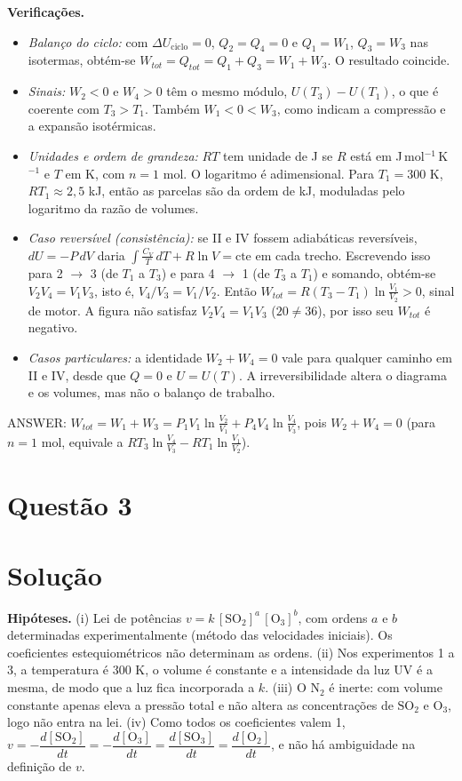 \documentclass{article}%
\begin{document}
\noindent\textbf{Verificações.}
\begin{itemize}
  \item \emph{Balanço do ciclo:} com $\Delta U_{\text{ciclo}} = 0$, $Q_2 = Q_4 = 0$ e $Q_1 = W_1$, $Q_3 = W_3$ nas isotermas, obtém-se $W_{tot} = Q_{tot} = Q_1 + Q_3 = W_1 + W_3$. O resultado coincide.
  \item \emph{Sinais:} $W_2 < 0$ e $W_4 > 0$ têm o mesmo módulo, $U(T_3) - U(T_1)$, o que é coerente com $T_3 > T_1$. Também $W_1 < 0 < W_3$, como indicam a compressão e a expansão isotérmicas.
  \item \emph{Unidades e ordem de grandeza:} $RT$ tem unidade de J se $R$ está em J\,mol$^{-1}$\,K$^{-1}$ e $T$ em K, com $n = 1$ mol. O logaritmo é adimensional. Para $T_1 = 300$ K, $RT_1 \approx 2{,}5$ kJ, então as parcelas são da ordem de kJ, moduladas pelo logaritmo da razão de volumes.
  \item \emph{Caso reversível (consistência):} se II e IV fossem adiabáticas reversíveis, $dU = -P\,dV$ daria $\int \frac{C_V}{T}\,dT + R\ln V = \text{cte}$ em cada trecho. Escrevendo isso para 2 $\to$ 3 (de $T_1$ a $T_3$) e para 4 $\to$ 1 (de $T_3$ a $T_1$) e somando, obtém-se $V_2V_4 = V_1V_3$, isto é, $V_4/V_3 = V_1/V_2$. Então $W_{tot} = R(T_3 - T_1)\ln\frac{V_1}{V_2} > 0$, sinal de motor. A figura não satisfaz $V_2V_4 = V_1V_3$ ($20 \neq 36$), por isso seu $W_{tot}$ é negativo.
  \item \emph{Casos particulares:} a identidade $W_2 + W_4 = 0$ vale para qualquer caminho em II e IV, desde que $Q = 0$ e $U = U(T)$. A irreversibilidade altera o diagrama e os volumes, mas não o balanço de trabalho.
\end{itemize}

\noindent ANSWER: $W_{tot} = W_1 + W_3 = P_1V_1\ln\frac{V_2}{V_1} + P_4V_4\ln\frac{V_4}{V_3}$, pois $W_2 + W_4 = 0$ (para $n = 1$ mol, equivale a $RT_3\ln\frac{V_4}{V_3} - RT_1\ln\frac{V_1}{V_2}$).%
\newpage%
\section*{Questão 3}

\section*{Solução}

\textbf{Hipóteses.} (i) Lei de potências $v = k\,[\mathrm{SO_2}]^{a}\,[\mathrm{O_3}]^{b}$, com ordens $a$ e $b$ determinadas experimentalmente (método das velocidades iniciais). Os coeficientes estequiométricos não determinam as ordens. (ii) Nos experimentos 1 a 3, a temperatura é 300 K, o volume é constante e a intensidade da luz UV é a mesma, de modo que a luz fica incorporada a $k$. (iii) O $\mathrm{N_2}$ é inerte: com volume constante apenas eleva a pressão total e não altera as concentrações de $\mathrm{SO_2}$ e $\mathrm{O_3}$, logo não entra na lei. (iv) Como todos os coeficientes valem 1, $v = -\dfrac{d[\mathrm{SO_2}]}{dt} = -\dfrac{d[\mathrm{O_3}]}{dt} = \dfrac{d[\mathrm{SO_3}]}{dt} = \dfrac{d[\mathrm{O_2}]}{dt}$, e não há ambiguidade na definição de $v$.
\end{document}
